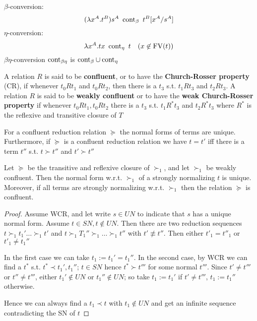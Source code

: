 \documentclass[11pt]{article}
\begin{document}
\(\beta\)-conversion:
\begin{equation*}
(\lambda x^A.t^B) s^A\enspace\text{cont}_\beta\enspace t^B[x^A/s^A]
\end{equation*}
\(\eta\)-conversion:
\begin{equation*}
\lambda x^A.tx\enspace\text{cont}_\eta\enspace  t\quad(x\not\in\text{FV}(t))
\end{equation*}
\(\beta \eta\)-conversion \(\text{cont}_{\beta\eta}\) is \(\text{cont}_\beta\cup\text{cont}_\eta\)

\begin{definition}[]
A relation \(R\) is said to be \textbf{confluent}, or to have the \textbf{Church-Rosser property}
(CR), if whenever \(t_0 Rt_1\) and \(t_0Rt_2\), then there is a \(t_3\) s.t.
\(t_1Rt_3\) and \(t_2Rt_3\). A relation \(R\) is said to be \textbf{weakly confluent} or to
have the \textbf{weak Church-Rosser property} if whenever \(t_0Rt_1,t_0Rt_2\) there is a
\(t_3\) s.t. \(t_1R^*t_3\) and \(t_2R^* t_3\) where \(R^*\) is the reflexive and
transitive closure of \(T\)
\end{definition}

\begin{theorem}[]
For a confluent reduction relation \(\succeq\) the normal forms of terms are
unique. Furthermore, if \(\succeq\) is a confluent reduction relation we have
\(t=t'\) iff there is a term \(t''\) s.t. \(t\succ t''\) and \(t'\succ t''\)
\end{theorem}

\begin{theorem}
Let \(\succeq\) be the transitive and reflexive closure of \(\succ_1\), and let
\(\succ_1\) be weakly confluent. Then the normal form w.r.t. \(\succ_1\) of a
strongly normalizing \(t\) is unique. Moreover, if all terms are strongly
normalizing w.r.t. \(\succ_1\) then the relation \(\succeq\) is confluent.
\end{theorem}

\begin{proof}
Assume WCR, and let write \(s\in UN\) to indicate that \(s\) has a unique normal
form. Assume \(t\in SN, t\not\in UN\). Then there are two reduction sequences
\(t\succ_1 t_1'\dots\succ_1 t'\) and \(t\succ_1 T_1''\succ_1\dots\succ_1 t''\) with
\(t'\not\equiv t''\). Then either \(t'_1=t''_1\) or \(t'_1\neq t_1''\)

In the first case we can take \(t_1:=t_1'=t_1''\). In the second case, by WCR
we can find a \(t^*\) s.t. \(t^*\prec t_1',t_1''\); \(t\in SN\) hence \(t^*\succ
   t'''\) for some normal \(t'''\). Since \(t'\neq t'''\) or \(t''\neq t'''\), either
\(t_1'\not\in UN\) or \(t_1''\not\in UN\); so take \(t_1:=t_1'\) if \(t'\neq t'''\),
\(t_1:=t_1''\) otherwise.

Hence we can always find a \(t_1\prec t\) with \(t_1\not\in UN\) and get an
infinite sequence contradicting the SN of \(t\)
\end{proof}
\end{document}
